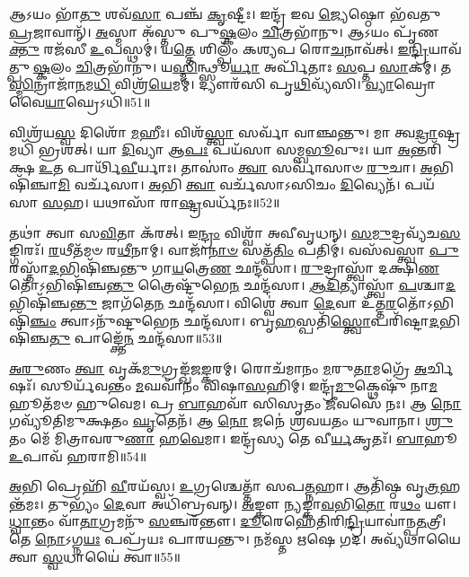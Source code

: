 𑌆𑌽𑌯𑌂 𑌭𑌾᳴\-\ul{𑌤𑍁} 𑌶𑌵᳴\-\ul{𑌸𑌾} 𑌪𑌞𑍍𑌚᳴ \ul{𑌕𑍃}\-𑌷𑍍𑌟𑍀𑌃।
𑌇𑌨𑍍𑌦𑍍𑌰᳴ 𑌇𑌵 \ul{𑌜𑍍𑌯𑍇}\-𑌷𑍍𑌠𑍋 𑌭᳴𑌵𑌤𑍁 \ul{𑌪𑍍𑌰}\-𑌜𑌾𑌵𑌾𑌨𑍍᳴।
\-\ul{𑌅}\-𑌸𑍍𑌮𑌾 𑌅᳴𑌸𑍍𑌤𑍁 𑌪𑍁\-\ul{𑌷𑍍𑌕}\-𑌲𑌂 \ul{𑌚𑌿}\-𑌤𑍍𑌰𑌭𑌾᳴𑌨𑍁।
𑌆𑌽𑌯𑌂 𑌪𑍃᳴𑌣\-\ul{𑌕𑍍𑌤𑍁} 𑌰𑌜᳴𑌸𑍀 \ul{𑌉}\-𑌪𑌸𑍍𑌥𑌮𑍍॑।
𑌯\-\ul{𑌤𑍍𑌤𑍇} 𑌶𑌿𑌲𑍍𑌪𑌂᳴ 𑌕𑌶𑍍𑌯𑌪 𑌰𑍋\-\ul{𑌚}\-𑌨𑌾𑌵᳴𑌤𑍍।
\-\ul{𑌇}\-\-\ul{𑌨𑍍𑌦𑍍𑌰𑌿}\-𑌯𑌾𑌵᳴𑌤𑍍𑌪𑍁\-\ul{𑌷𑍍𑌕}\-𑌲𑌂 \ul{𑌚𑌿}\-𑌤𑍍𑌰𑌭𑌾᳴𑌨𑍁।
𑌯\-\ul{𑌸𑍍𑌮𑌿}\-𑌨𑍍𑌥𑍍𑌸𑍂\-\ul{𑌰𑍍𑌯𑌾} 𑌅𑌰𑍍𑌪𑌿᳴𑌤𑌾𑌃 \ul{𑌸}\-𑌪𑍍𑌤 \ul{𑌸𑌾}\-𑌕𑌮𑍍।
𑌤\-\ul{𑌸𑍍𑌮𑌿}\-𑌨𑍍𑌰𑌾𑌜𑌾᳴\-\ul{𑌨}\-𑌮\-\ul{𑌧𑌿} 𑌵𑌿𑌶𑍍𑌰᳴\-\ul{𑌯𑍇}\-𑌮𑌮𑍍।
𑌦𑍍𑌯𑍗𑌰᳴𑌸𑌿 𑌪𑍃\-\ul{𑌥𑌿}\-𑌵𑍍𑌯᳴𑌸𑌿।
\-\ul{𑌵𑍍𑌯𑌾}\-𑌘𑍍𑌰𑍋 𑌵𑍈\-\ul{𑌯𑌾}\-𑌘𑍍𑌰𑍇\-𑌽𑌧𑌿᳴॥51॥

𑌵𑌿𑌶𑍍𑌰᳴𑌯\-\ul{𑌸𑍍𑌵} 𑌦𑌿𑌶𑍋᳴ \ul{𑌮}\-𑌹𑍀𑌃।
𑌵𑌿𑌶᳴\-\ul{𑌸𑍍𑌤𑍍𑌵𑌾} 𑌸𑌰𑍍𑌵𑌾᳴ 𑌵𑌾𑌞𑍍𑌛𑌨𑍍𑌤𑍁।
𑌮𑌾 𑌤𑍍𑌵\-\ul{𑌦𑍍𑌰𑌾}\-𑌷𑍍𑌟𑍍𑌰𑌮𑌧𑌿᳴ 𑌭𑍍𑌰𑌶𑌤𑍍।
𑌯𑌾 \ul{𑌦𑌿}\-𑌵𑍍𑌯𑌾 𑌆\-\ul{𑌪𑌃} 𑌪𑌯᳴𑌸𑌾 𑌸𑌮𑍍𑌬\-\ul{𑌭𑍂}\-𑌵𑍁𑌃।
𑌯𑌾 \ul{𑌅}\-𑌨𑍍𑌤𑌰𑌿᳴𑌕𑍍𑌷 \ul{𑌉}\-𑌤 𑌪𑌾𑌰𑍍𑌥𑌿᳴\-\ul{𑌵𑍀}\-𑌰𑍍𑌯𑌾𑌃।
𑌤𑌾𑌸𑌾𑌂॑ \ul{𑌤𑍍𑌵𑌾} 𑌸𑌰𑍍𑌵𑌾᳴𑌸𑌾𑍞 \ul{𑌰𑍁}\-𑌚𑌾।
\-\ul{𑌅}\-𑌭𑌿𑌷𑌿᳴𑌞𑍍𑌚𑌾\-\ul{𑌮𑌿} 𑌵𑌰𑍍𑌚᳴𑌸𑌾।
\-\ul{𑌅}\-𑌭𑌿 \ul{𑌤𑍍𑌵𑌾} 𑌵𑌰𑍍𑌚᳴𑌸𑌾\-𑌽𑌸𑌿𑌚𑌂 \ul{𑌦𑌿}\-𑌵𑍍𑌯𑍇𑌨᳴।
𑌪𑌯᳴𑌸𑌾 \ul{𑌸}\-𑌹।
𑌯𑌥𑌾𑌸𑌾᳴ 𑌰𑌾\-\ul{𑌷𑍍𑌟𑍍𑌰}\-𑌵𑌰𑍍𑌧᳴𑌨𑌃॥52॥

𑌤𑌥𑌾॑ 𑌤𑍍𑌵𑌾 𑌸\-\ul{𑌵𑌿}\-𑌤𑌾 𑌕᳴𑌰𑌤𑍍।
𑌇\-\ul{𑌨𑍍𑌦𑍍𑌰𑌂} 𑌵𑌿𑌶𑍍𑌵𑌾᳴ 𑌅𑌵𑍀𑌵𑍃𑌧𑌨𑍍।
\-\ul{𑌸}\-\-\ul{𑌮𑍁}\-𑌦𑍍𑌰𑌵𑍍𑌯᳴𑌚\-\ul{𑌸}\-𑌙𑍍𑌗𑌿𑌰𑌃᳴।
\-\ul{𑌰}\-𑌥𑍀𑌤᳴𑌮𑍞 𑌰\-\ul{𑌥𑍀}\-𑌨𑌾𑌮𑍍।
𑌵𑌾𑌜𑌾᳴\-\ul{𑌨𑌾}\-\-\ul{𑍞} 𑌸𑌤𑍍𑌪᳴\-\ul{𑌤𑌿𑌂} 𑌪𑌤𑌿𑌮𑍍॑।
𑌵𑌸᳴𑌵𑌸𑍍𑌤𑍍𑌵𑌾 \ul{𑌪𑍁}\-𑌰𑌸𑍍𑌤𑌾᳴\-\ul{𑌦}\-𑌭𑌿𑌷𑌿᳴𑌞𑍍𑌚𑌨𑍍𑌤𑍁 𑌗𑌾\-\ul{𑌯}\-𑌤𑍍𑌰𑍇\-\ul{𑌣} 𑌛𑌨𑍍𑌦᳴𑌸𑌾।
\-\ul{𑌰𑍁}\-𑌦𑍍𑌰𑌾𑌸𑍍𑌤𑍍𑌵𑌾᳴ 𑌦𑌕𑍍𑌷𑌿\-\ul{𑌣}\-𑌤𑍋᳴\-𑌽𑌭𑌿𑌷𑌿᳴𑌞𑍍𑌚\-\ul{𑌨𑍍𑌤𑍁} 𑌤𑍍𑌰𑍈𑌷𑍍𑌟𑍁᳴𑌭𑍇\-\ul{𑌨} 𑌛𑌨𑍍𑌦᳴𑌸𑌾।
\-\ul{𑌆}\-\-\ul{𑌦𑌿}\-𑌤𑍍𑌯𑌾𑌸𑍍𑌤𑍍𑌵𑌾᳴ \ul{𑌪}\-𑌶𑍍𑌚𑌾\-\ul{𑌦}\-𑌭𑌿𑌷𑌿᳴𑌞𑍍𑌚\-\ul{𑌨𑍍𑌤𑍁} 𑌜𑌾𑌗᳴𑌤𑍇\-\ul{𑌨} 𑌛𑌨𑍍𑌦᳴𑌸𑌾।
𑌵𑌿𑌶𑍍𑌵𑍇॑ 𑌤𑍍𑌵𑌾 \ul{𑌦𑍇}\-𑌵𑌾 𑌉᳴𑌤𑍍𑌤\-\ul{𑌰}\-𑌤𑍋᳴\-𑌽𑌭𑌿𑌷𑌿᳴\-\ul{𑌞𑍍𑌚𑌂} 𑌤𑍍𑌵𑌾𑌽𑌨𑍁᳴𑌷𑍍𑌟𑍁𑌭𑍇\-\ul{𑌨} 𑌛𑌨𑍍𑌦᳴𑌸𑌾। 
𑌬𑍃\-\ul{𑌹}\-𑌸𑍍𑌪𑌤𑌿᳴\-\ul{𑌸𑍍𑌤𑍍𑌵𑍋}\-𑌪𑌰𑌿᳴𑌷𑍍𑌟𑌾\-\ul{𑌦}\-𑌭𑌿𑌷𑌿᳴𑌞𑍍𑌚\-\ul{𑌤𑍁} 𑌪𑌾𑌙𑍍𑌕𑍍𑌤𑍇᳴\-\ul{𑌨} 𑌛𑌨𑍍𑌦᳴𑌸𑌾॥53॥

\-\ul{𑌅}\-\-\ul{𑌰𑍁}\-𑌣𑌂 \ul{𑌤𑍍𑌵𑌾} 𑌵𑍃𑌕᳴\-\ul{𑌮𑍁}\-𑌗𑍍𑌰𑌙𑍍𑌖᳴𑌜\-\ul{𑌙𑍍𑌕}\-𑌰𑌮𑍍।
𑌰𑍋𑌚᳴𑌮𑌾𑌨𑌂 \ul{𑌮}\-𑌰𑍁\-\ul{𑌤𑌾}\-𑌮𑌗𑍍𑌰𑍇᳴ \ul{𑌅}\-𑌰𑍍𑌚𑌿𑌷𑌃᳴।
𑌸𑍂𑌰𑍍𑌯᳴𑌵𑌨𑍍𑌤𑌂 \ul{𑌮}\-𑌘𑌵𑌾᳴𑌨𑌂 𑌵𑌿𑌷𑌾\-\ul{𑌸}\-𑌹𑌿𑌮𑍍।
𑌇𑌨𑍍𑌦𑍍𑌰᳴\-\ul{𑌮𑍁}\-𑌕𑍍𑌥𑍇𑌷𑍁᳴ 𑌨𑌾\-\ul{𑌮}\-𑌹𑍂𑌤᳴𑌮𑍞 𑌹𑍁𑌵𑍇𑌮।
𑌪𑍍𑌰 \ul{𑌬𑌾}\-𑌹𑌵𑌾᳴ 𑌸𑌿𑌸𑍃𑌤𑌂 \ul{𑌜𑍀}\-𑌵𑌸𑍇᳴ 𑌨𑌃।
𑌆 \ul{𑌨𑍋} 𑌗𑌵𑍍𑌯𑍂᳴𑌤𑌿𑌮𑍁𑌕𑍍𑌷𑌤𑌂 \ul{𑌘𑍃}\-𑌤𑍇𑌨᳴।
𑌆 \ul{𑌨𑍋} 𑌜𑌨𑍇॑ 𑌶𑍍𑌰𑌵𑌯𑌤𑌂 𑌯𑍁𑌵𑌾𑌨𑌾।
\-\ul{𑌶𑍍𑌰𑍁}\-𑌤𑌂 𑌮𑍇᳴ 𑌮𑌿𑌤𑍍𑌰𑌾𑌵𑌰𑍁\-\ul{𑌣𑌾} 𑌹\-\ul{𑌵𑍇}\-𑌮𑌾।
𑌇𑌨𑍍𑌦𑍍𑌰᳴𑌸𑍍𑌯 𑌤𑍇 𑌵𑍀\-\ul{𑌰𑍍𑌯}\-𑌕𑍃𑌤𑌃᳴।
\-\ul{𑌬𑌾}\-𑌹𑍂 \ul{𑌉}\-𑌪𑌾𑌵᳴ 𑌹𑌰𑌾𑌮𑌿॥54॥\anuvakamend[\-\ul{𑌬}\-\-\ul{𑌭𑍂}\-𑌵𑌾𑌵𑍍𑌯᳴\-\ul{𑌯}\-𑌤𑍍𑌤𑍇\-\ul{𑌨𑍇}\-𑌮𑌮᳴𑌗𑍍𑌨 \ul{𑌇}\-𑌹 𑌵𑌰𑍍𑌚᳴\-\ul{𑌸𑌾} 𑌸𑌮᳴\-\ul{𑌙𑍍𑌗𑍍𑌧𑌿} 𑌵𑍈\-\ul{𑌯𑌾}\-𑌘𑍍𑌰𑍇𑌽𑌧𑌿᳴ 𑌰𑌾\-\ul{𑌷𑍍𑌟𑍍𑌰}\-𑌵𑌰𑍍𑌧᳴\-\ul{𑌨𑌃} 𑌪𑌾𑌙𑍍𑌕𑍍𑌤𑍇᳴\-\ul{𑌨} 𑌛𑌨𑍍𑌦᳴\-\ul{𑌸𑍋}\-𑌪𑌾𑌵᳴𑌹𑌰𑌾𑌮𑌿]

\-\ul{𑌅}\-𑌭𑌿 𑌪𑍍𑌰𑍇𑌹𑌿᳴ \ul{𑌵𑍀}\-𑌰𑌯᳴𑌸𑍍𑌵।
\-\ul{𑌉}\-𑌗𑍍𑌰𑌶𑍍𑌚𑍇𑌤𑍍𑌤𑌾᳴ 𑌸𑌪\-\ul{𑌤𑍍𑌨}\-𑌹𑌾।
𑌆𑌤𑌿᳴𑌷𑍍𑌠 𑌵𑍃\-\ul{𑌤𑍍𑌰}\-𑌹𑌨𑍍𑌤᳴𑌮𑌃।
𑌤𑍁𑌭𑍍𑌯𑌂᳴ \ul{𑌦𑍇}\-𑌵𑌾 𑌅𑌧𑌿᳴𑌬𑍍𑌰𑌵𑌨𑍍।
\-\ul{𑌅}\-𑌙𑍍𑌕𑍗 \ul{𑌨𑍍𑌯}\-𑌙𑍍𑌕𑌾\-\ul{𑌵}\-𑌭𑌿\-\ul{𑌤𑍋} 𑌰\-\ul{𑌥𑌂} 𑌯𑍗।
\-\ul{𑌧𑍍𑌵𑌾}\-𑌨𑍍𑌤𑌂 𑌵𑌾᳴\-\ul{𑌤𑌾}\-𑌗𑍍𑌰𑌮𑌨𑍁᳴ \ul{𑌸}\-𑌞𑍍𑌚𑌰᳴𑌨𑍍𑌤𑍗।
\-\ul{𑌦𑍂}\-𑌰𑍇𑌹𑍇᳴𑌤𑌿𑌰𑌿\-\ul{𑌨𑍍𑌦𑍍𑌰𑌿}\-𑌯𑌾𑌵𑌾॑𑌨𑍍𑌪\-\ul{𑌤}\-𑌤𑍍𑌰𑍀।
𑌤𑍇 \ul{𑌨𑍋}\-\-𑌽𑌗𑍍𑌨\-\ul{𑌯𑌃} 𑌪𑌪𑍍𑌰᳴𑌯𑌃 𑌪𑌾𑌰𑌯𑌨𑍍𑌤𑍁।
𑌨𑌮᳴𑌸𑍍𑌤 𑌋𑌷𑍇 𑌗𑌦।
𑌅𑌵𑍍𑌯᳴𑌥𑌾𑌯𑍈 𑌤𑍍𑌵𑌾 \ul{𑌸𑍍𑌵}\-𑌧𑌾𑌯𑍈॑ 𑌤𑍍𑌵𑌾॥55॥

